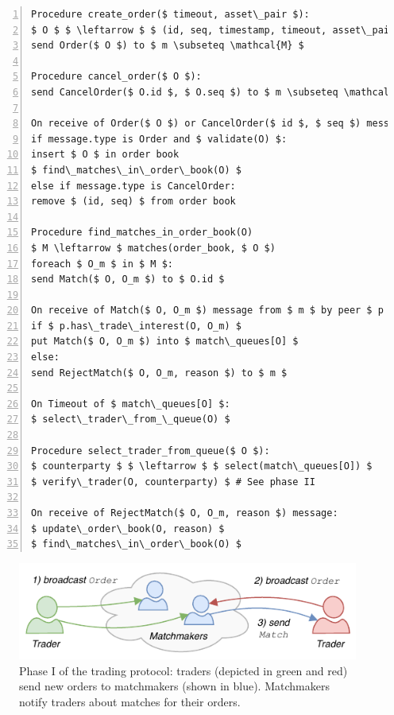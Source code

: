 
\begin{lstlisting}[firstnumber=1,caption={Phase I: Order creation and matching.},label={alg:phase1},captionpos=b,numbers=left,float=t, tabsize=2, basicstyle=\footnotesize\ttfamily, mathescape=true, emph={while, if, then, do, Procedure, record, send, remove, insert, put, receive, in, foreach, ignore, else},emphstyle=\bf, frame=TB]
Procedure create_order($ timeout, asset\_pair $):
$ O $ $ \leftarrow $ $ (id, seq, timestamp, timeout, asset\_pair) $
send Order($ O $) to $ m \subseteq \mathcal{M} $ 

Procedure cancel_order($ O $):
send CancelOrder($ O.id $, $ O.seq $) to $ m \subseteq \mathcal{M} $ 

On receive of Order($ O $) or CancelOrder($ id $, $ seq $) message by peer $ p $:
if message.type is Order and $ validate(O) $:
insert $ O $ in order book
$ find\_matches\_in\_order\_book(O) $
else if message.type is CancelOrder:
remove $ (id, seq) $ from order book

Procedure find_matches_in_order_book(O)
$ M \leftarrow $ matches(order_book, $ O $)
foreach $ O_m $ in $ M $:
send Match($ O, O_m $) to $ O.id $

On receive of Match($ O, O_m $) message from $ m $ by peer $ p $:
if $ p.has\_trade\_interest(O, O_m) $
put Match($ O, O_m $) into $ match\_queues[O] $
else:
send RejectMatch($ O, O_m, reason $) to $ m $

On Timeout of $ match\_queues[O] $:
$ select\_trader\_from_\_queue(O) $

Procedure select_trader_from_queue($ O $):
$ counterparty $ $ \leftarrow $ $ select(match\_queues[O]) $
$ verify\_trader(O, counterparty) $ # See phase II

On receive of RejectMatch($ O, O_m, reason $) message:
$ update\_order\_book(O, reason) $
$ find\_matches\_in\_order\_book(O) $	
\end{lstlisting}

\begin{figure}[h]
	\centering
	\includegraphics[width=0.7\linewidth]{xchange/assets/xchange_protocol_1}
	\caption{Phase I of the \ModelName{} trading protocol: traders (depicted in green and red) send new orders to matchmakers (shown in blue). Matchmakers notify traders about matches for their orders. }
	\label{fig:matching_protocol_1}
\end{figure}

